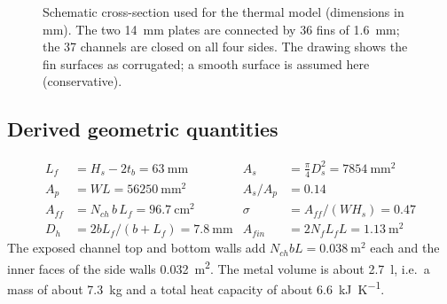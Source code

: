 \documentclass[11pt,a4paper]{article}
\begin{document}
\begin{figure}[htbp]
\centering
{}
\caption{Schematic cross-section used for the thermal model (dimensions in mm). The two \SI{14}{\milli\metre} plates are connected by 36 fins of \SI{1.6}{\milli\metre}; the 37 channels are closed on all four sides. The drawing shows the fin surfaces as corrugated; a smooth surface is assumed here (conservative).}
\label{fig:section}
\end{figure}

\subsection{Derived geometric quantities}

\begin{align}
L_f &= H_s - 2t_b = \SI{63}{\milli\metre} &
A_s &= \tfrac{\pi}{4}D_s^2 = \SI{7854}{\milli\metre\squared} \nonumber\\
A_p &= W L = \SI{56250}{\milli\metre\squared} &
A_s/A_p &= 0.14 \nonumber\\
A_{ff} &= N_{ch}\, b\, L_f = \SI{96.7}{\centi\metre\squared} &
\sigma &= A_{ff}/(W H_s) = 0.47 \nonumber\\
D_h &= 2 b L_f/(b+L_f) = \SI{7.8}{\milli\metre} &
A_{fin} &= 2 N_f L_f L = \SI{1.13}{\metre\squared} \nonumber
\end{align}
The exposed channel top and bottom walls add $N_{ch} b L = \SI{0.038}{\metre\squared}$ each and the inner faces of the side walls \SI{0.032}{\metre\squared}. The metal volume is about \SI{2.7}{\litre}, i.e.\ a mass of about \SI{7.3}{\kilo\gram} and a total heat capacity of about \SI{6.6}{\kilo\joule\per\kelvin}.
\end{document}
